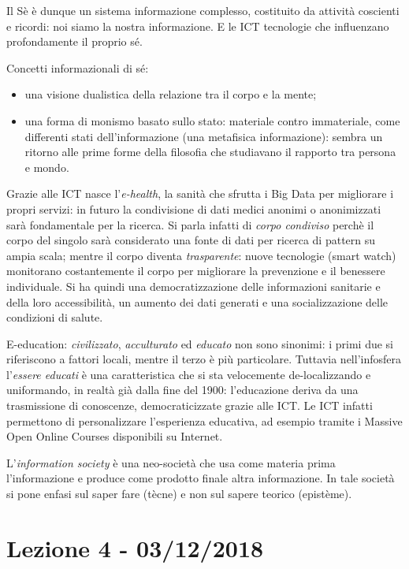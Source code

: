 \documentclass[a4page, 11pt]{article}
\begin{document}
Il Sè è dunque un sistema informazione complesso, costituito da attività coscienti e ricordi: noi siamo la nostra informazione.
E le ICT tecnologie che influenzano profondamente il proprio sé.

Concetti informazionali di sé:
\begin{itemize}
  \item una visione dualistica della relazione tra il corpo e la mente;
  \item una forma di monismo basato sullo stato: materiale contro immateriale, come differenti stati dell'informazione (una metafisica informazione): sembra un ritorno alle prime forme della filosofia che studiavano il rapporto tra persona e mondo.
\end{itemize}


Grazie alle ICT nasce l'\textit{e-health}, la sanità che sfrutta i Big Data per migliorare i propri servizi: in futuro la condivisione di dati medici anonimi o anonimizzati sarà fondamentale per la ricerca.
Si parla infatti di \textit{corpo condiviso} perchè il corpo del singolo sarà considerato una fonte di dati per ricerca di pattern su ampia scala; mentre il corpo diventa \textit{trasparente}: nuove tecnologie (smart watch) monitorano costantemente il corpo per migliorare la prevenzione e il benessere individuale.
Si ha quindi una democratizzazione delle informazioni sanitarie e della loro accessibilità, un aumento dei dati generati e una socializzazione delle condizioni di salute.

E-education: \textit{civilizzato}, \textit{acculturato} ed \textit{educato} non sono sinonimi: i primi due si riferiscono a fattori locali, mentre il terzo è più particolare.
Tuttavia nell'infosfera l'\textit{essere educati} è una caratteristica che si sta velocemente de-localizzando e uniformando, in realtà già dalla fine del 1900: l'educazione deriva da una trasmissione di conoscenze, democraticizzate grazie alle ICT.
Le ICT infatti permettono di personalizzare l'esperienza educativa, ad esempio tramite i Massive Open Online Courses disponibili su Internet.

L'\textit{information society} è una neo-società che usa come materia prima l'informazione e produce come prodotto finale altra informazione.
In tale società si pone enfasi sul saper fare (tècne) e non sul sapere teorico (epistème).



\section*{Lezione 4 - 03/12/2018}
\end{document}
